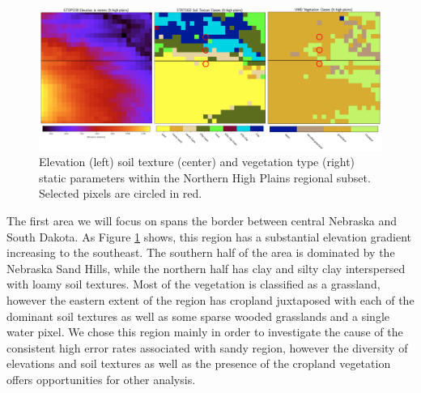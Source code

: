 \begin{figure}[h!]
    \centering

    \includegraphics[width=.99\linewidth,draft=false]{figures/lt-static/static_all-3_high-plains_circled.png}

    \caption{Elevation (left) soil texture (center) and vegetation type (right) static parameters within the Northern High Plains regional subset. Selected pixels are circled in red.}
    \label{lt_static_high-plains}
\end{figure}

The first area we will focus on spans the border between central Nebraska and South Dakota. As Figure \ref{lt_static_high-plains} shows, this region has a substantial elevation gradient increasing to the southeast. The southern half of the area is dominated by the Nebraska Sand Hills, while the northern half has clay and silty clay interspersed with loamy soil textures. Most of the vegetation is classified as a grassland, however the eastern extent of the region has cropland juxtaposed with each of the dominant soil textures as well as some sparse wooded grasslands and a single water pixel. We chose this region mainly in order to investigate the cause of the consistent high error rates associated with sandy region, however the diversity of elevations and soil textures as well as the presence of the cropland vegetation offers opportunities for other analysis.

